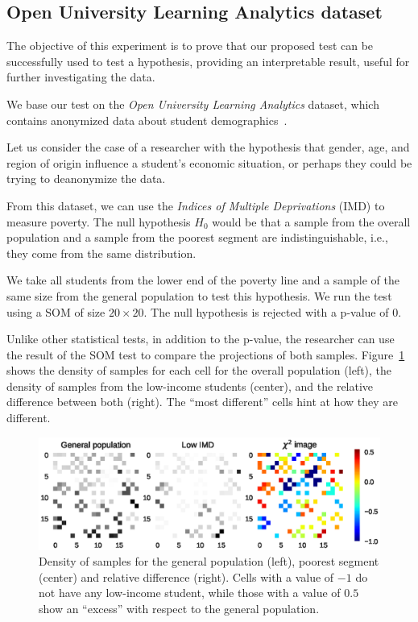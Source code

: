 \subsection{Open University Learning Analytics dataset}
\label{subsec:som_oulad}
The objective of this experiment is to prove that our proposed test can be successfully
used to test a hypothesis, providing an interpretable result, useful for further
investigating the data.

We base our test on the \emph{Open University Learning Analytics}
dataset, which contains anonymized data about student demographics~\cite{kuzilek_open_2017}.

Let us consider the case of a researcher with the hypothesis that gender, age, and
region of origin influence a student's economic situation, or perhaps they could
be trying to deanonymize the data.

From this dataset, we can use the \emph{Indices of Multiple Deprivations} (IMD) to measure poverty.
The null hypothesis $H_0$ would be that a sample from the overall population and a sample from
the poorest segment are indistinguishable, i.e., they come from the same distribution.

We take all students from the lower end of the poverty line and a sample of the same size
from the general population to test this hypothesis. We run the test using a \gls{SOM}  of size
$20\times20$. The null hypothesis is rejected with a p-value of $0$.

Unlike other statistical tests, in addition to the p-value, the researcher can use
the result of the \gls{SOM}  test to compare the projections of both samples.
Figure~\ref{fig:oulad_grid} shows the density of samples for each cell for the overall population
(left), the density of samples from the low-income students (center), and the relative difference
between both (right). The ``most different'' cells hint at how they are different.

\begin{figure}[t]
    \centering
    \includegraphics[width=\textwidth]{images/4_som/imd.eps}
    \caption{Density of samples for the general population (left), poorest segment (center) and
    relative difference (right). Cells with a value of $-1$ do not have any low-income student,
    while those with a value of $0.5$ show an ``excess'' with respect to the general
    population.}
    \label{fig:oulad_grid}
\end{figure}

